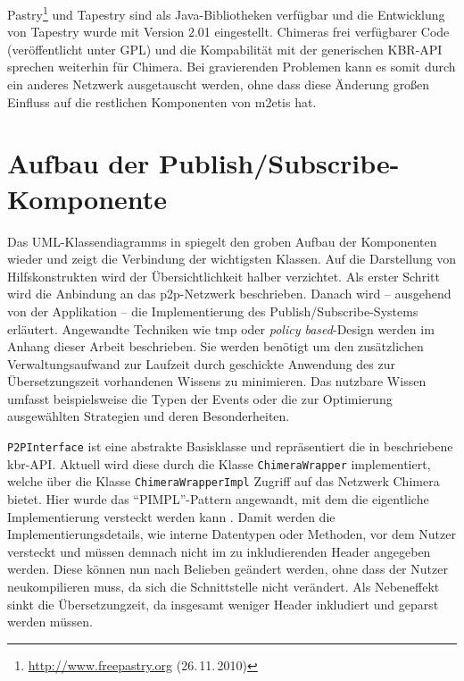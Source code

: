 Pastry\footnote{\url{http://www.freepastry.org} (26.\,11.\,2010)} und Tapestry sind als Java-Bibliotheken verfügbar und die Entwicklung von Tapestry wurde mit Version 2.01 eingestellt. Chimeras frei verfügbarer Code (veröffentlicht unter GPL) und die Kompabilität mit der generischen KBR-API sprechen weiterhin für Chimera. Bei gravierenden Problemen kann es somit durch ein anderes Netzwerk ausgetauscht werden, ohne dass diese Änderung großen Einfluss auf die restlichen Komponenten von \ac{m2etis} hat. 


\section{Aufbau der Publish/Subscribe-Komponente}

Das UML-Klassendiagramms in  spiegelt den groben Aufbau der Komponenten wieder und zeigt die Verbindung der wichtigsten Klassen. Auf die Darstellung von Hilfskonstrukten wird der Übersichtlichkeit halber verzichtet. Als erster Schritt wird die Anbindung an das \ac{p2p}-Netzwerk beschrieben. Danach wird -- ausgehend von der Applikation -- die Implementierung des Publish/Subscribe-Systems erläutert. Angewandte Techniken wie \ac{tmp} oder \emph{policy based}-Design werden im Anhang dieser Arbeit beschrieben. Sie werden benötigt um den zusätzlichen Verwaltungsaufwand zur Laufzeit durch geschickte Anwendung des zur Übersetzungszeit vorhandenen Wissens zu minimieren. Das nutzbare Wissen umfasst beispielsweise die Typen der Events oder die zur Optimierung ausgewählten Strategien und deren Besonderheiten.

\texttt{P2PInterface} ist eine abstrakte Basisklasse und repräsentiert die in  beschriebene \ac{kbr}-API. Aktuell wird diese durch die Klasse \texttt{ChimeraWrapper} implementiert, welche über die Klasse \texttt{ChimeraWrapperImpl} Zugriff auf das Netzwerk Chimera bietet. Hier wurde das \enquote{PIMPL}-Pattern angewandt, mit dem die eigentliche Implementierung versteckt werden kann \cite{Alexandrescu2001Modern}. Damit werden die Implementierungsdetails, wie interne Datentypen oder Methoden, vor dem Nutzer versteckt und müssen demnach nicht im zu inkludierenden Header angegeben werden. Diese können nun nach Belieben geändert werden, ohne dass der Nutzer neukompilieren muss, da sich die Schnittstelle nicht verändert. Als Nebeneffekt sinkt die Übersetzungzeit, da insgesamt weniger Header inkludiert und geparst werden müssen.

